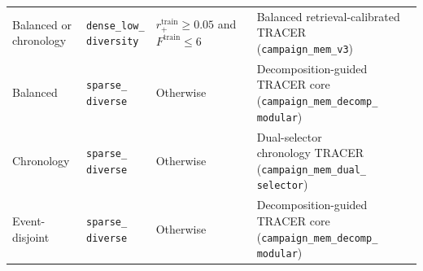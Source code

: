 \begin{table}[t]
{\begin{tabular}{@{}llll@{}}
\shortstack[l]{Balanced or\\chronology} & \shortstack[l]{\texttt{dense\_low\_}\\\texttt{diversity}} & \shortstack[l]{$r_{+}^{\mathrm{train}} \ge 0.05$ and\\$F^{\mathrm{train}} \le 6$} & \shortstack[l]{Balanced retrieval-calibrated TRACER\\(\texttt{campaign\_mem\_v3})} \\
Balanced & \shortstack[l]{\texttt{sparse\_}\\\texttt{diverse}} & Otherwise & \shortstack[l]{Decomposition-guided\\TRACER core\\(\texttt{campaign\_mem\_decomp\_}\\\texttt{modular})} \\
Chronology & \shortstack[l]{\texttt{sparse\_}\\\texttt{diverse}} & Otherwise & \shortstack[l]{Dual-selector\\chronology TRACER\\(\texttt{campaign\_mem\_dual\_}\\\texttt{selector})} \\
Event-disjoint & \shortstack[l]{\texttt{sparse\_}\\\texttt{diverse}} & Otherwise & \shortstack[l]{Decomposition-guided\\TRACER core\\(\texttt{campaign\_mem\_decomp\_}\\\texttt{modular})} \\
\bottomrule
\end{tabular}
}
\end{table}
